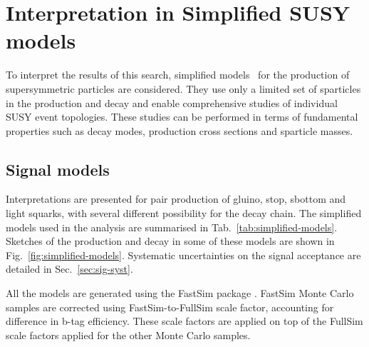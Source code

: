 \section{Interpretation in Simplified SUSY models}
\label{sec:susy}
To interpret the results of this search, simplified
models~\cite{Alwall:2008ag,Alwall:2008va,Alves:2011wf} for the production of supersymmetric particles are considered. 
They use only a limited set of sparticles in the production and
decay and enable comprehensive studies of individual SUSY event
topologies. These studies can be performed in terms of
fundamental properties such as decay modes, production cross sections and sparticle masses. 

\subsection{Signal models}
\label{sec:susy_models}
Interpretations are presented for pair production of gluino, stop, sbottom and light squarks, 
with several different possibility for the decay chain. 
The simplified models used in the analysis are summarised in Tab.~\ref{tab:simplified-models}. 
Sketches of the production and decay in some of these models are shown in Fig.~\ref{fig:simplified-models}.
Systematic uncertainties on the signal acceptance are detailed in Sec.~\ref{sec:sig-syst}. 

All the models are generated using the FastSim package \cite{Abdullin:2011zz}. 
FastSim Monte Carlo samples are corrected using FastSim-to-FullSim scale factor, 
accounting for difference in b-tag efficiency. 
These scale factors are applied on top of the FullSim scale factors applied for the 
other Monte Carlo samples.


